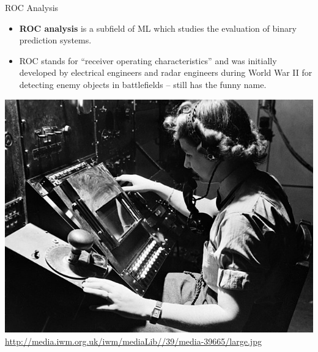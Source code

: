 \documentclass[11pt,compress,t,notes=noshow, xcolor=table]{beamer}
\begin{document}
\begin{frame}{ROC Analysis}

\begin{itemize}
  \item \textbf{ROC analysis} is a subfield of ML which studies the evaluation 
  of binary prediction systems.
  \item ROC stands for \enquote{receiver operating characteristics} and was 
  initially developed by electrical engineers and radar engineers during World 
  War II for detecting enemy objects in battlefields -- still has the funny 
  name.
\end{itemize}

\lz

\begin{center}
\includegraphics[width=.4\textwidth]{figure_man/receiver_operator.jpg}
{\tiny \url{http://media.iwm.org.uk/iwm/mediaLib//39/media-39665/large.jpg}}
\end{center}

\end{frame}


\end{document}

